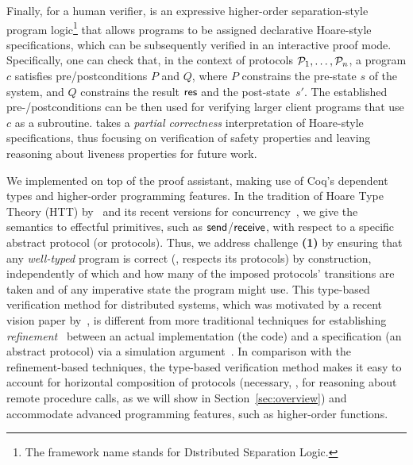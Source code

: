 Finally, for a human verifier, \disel is an expressive higher-order
separation-style program logic\footnote{The framework name stands for
  \textsc{Di}stributed \textsc{Se}paration \textsc{L}ogic.} that
allows programs to be assigned declarative Hoare-style specifications,
which can be subsequently verified in an interactive proof
mode. Specifically, one can check that, in the context of protocols
$\mathcal{P}_1, \ldots, \mathcal{P}_n$, a program $c$ satisfies pre/postconditions
$P$ and $Q$, where $P$ constrains the pre-state $s$ of the system, and
$Q$ constrains the result $\mathsf{res}$ and the post-state~$s'$.
%
%
The established pre-/postconditions can be then used for verifying
larger client programs that use $c$ as a subroutine.
%
\disel takes a \emph{partial correctness} interpretation of
Hoare-style specifications, thus focusing on verification of safety
properties and leaving reasoning about liveness properties for future
work.

We implemented \disel on top of the  proof
assistant, making use of Coq's dependent types and higher-order
programming features. In the tradition of Hoare Type Theory (HTT)
by~\citet{Nanevski-al:ICFP06,Nanevski-al:ICFP08,Nanevski-al:POPL10}
and its recent versions for
concurrency~\cite{LeyWild-Nanevski:POPL13,Nanevski-al:ESOP14}, we give
the semantics to effectful primitives, such as $\mathsf{send}$/$\mathsf{receive}$,
with respect to a specific abstract protocol (or protocols).
%
Thus, we address challenge \textbf{(1)} by ensuring that any
\emph{well-typed} program is correct (\ie, respects its protocols) by
construction, independently of which and how many of the imposed
protocols' transitions are taken and of any imperative state the
program might use.
%
This type-based verification method for distributed systems, which was
motivated by a recent vision paper by~\citet{Wilcox-al:SNAPL17}, is
different from more traditional techniques for establishing
\emph{refinement}~\cite{Abadi-Lamport:LICS88,Hawblitzel-al:SOSP15}
between an actual implementation (the code) and a specification (an
abstract protocol) via a simulation
argument~\cite{Lynch-Vaandrager:IC95}.
%
In comparison with the refinement-based techniques, the type-based
verification method makes it easy to account for horizontal
composition of protocols (necessary, \eg, for reasoning about remote
procedure calls, as we will show in Section~\ref{sec:overview}) and
accommodate advanced programming features, such as higher-order
functions.

